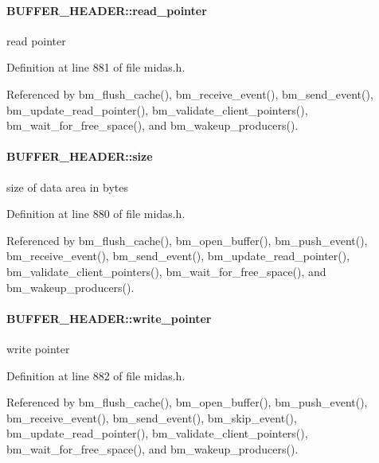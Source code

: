 \paragraph[{read\_\-pointer}]{ {\bf BUFFER\_\-HEADER::read\_\-pointer}}\hfill\label{structBUFFER__HEADER_add4be4a3e858fc79d67f2625c1771874}
read pointer 

Definition at line 881 of file midas.h.

Referenced by bm\_\-flush\_\-cache(), bm\_\-receive\_\-event(), bm\_\-send\_\-event(), bm\_\-update\_\-read\_\-pointer(), bm\_\-validate\_\-client\_\-pointers(), bm\_\-wait\_\-for\_\-free\_\-space(), and bm\_\-wakeup\_\-producers().
\paragraph[{size}]{ {\bf BUFFER\_\-HEADER::size}}\hfill\label{structBUFFER__HEADER_adedca43a59b3dd2c5cf10cff01dc46a3}
size of data area in bytes 

Definition at line 880 of file midas.h.

Referenced by bm\_\-flush\_\-cache(), bm\_\-open\_\-buffer(), bm\_\-push\_\-event(), bm\_\-receive\_\-event(), bm\_\-send\_\-event(), bm\_\-update\_\-read\_\-pointer(), bm\_\-validate\_\-client\_\-pointers(), bm\_\-wait\_\-for\_\-free\_\-space(), and bm\_\-wakeup\_\-producers().
\paragraph[{write\_\-pointer}]{ {\bf BUFFER\_\-HEADER::write\_\-pointer}}\hfill\label{structBUFFER__HEADER_a3431c98c823dc22dc046a947bd9675eb}
write pointer 

Definition at line 882 of file midas.h.

Referenced by bm\_\-flush\_\-cache(), bm\_\-open\_\-buffer(), bm\_\-push\_\-event(), bm\_\-receive\_\-event(), bm\_\-send\_\-event(), bm\_\-skip\_\-event(), bm\_\-update\_\-read\_\-pointer(), bm\_\-validate\_\-client\_\-pointers(), bm\_\-wait\_\-for\_\-free\_\-space(), and bm\_\-wakeup\_\-producers().